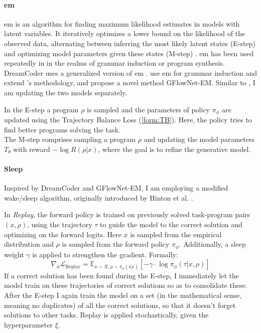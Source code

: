 \paragraph*{\acrfull{em}} \acrlong{em} is an algorithm for finding maximum likelihood estimates in models with latent variables. It iteratively optimizes a lower bound on the likelihood of the observed data, alternating between inferring the most likely latent states (E-step) and optimizing model parameters given these states (M-step) \cite{han2022data}. \acrshort{em} has been used repeatedly in in the realms of grammar induction or program synthesis. DreamCoder uses a generalized version of \acrshort{em} \cite{ellisDreamCoderBootstrappingInductive2021}. \citet{kimCompoundProbabilisticContextFree2019} use \acrshort{em} for grammar induction and \citet{Hu_Malkin_Jain_Everett_Graikos_Bengio_2023} extend \citeauthor{kimCompoundProbabilisticContextFree2019}'s \cite{kimCompoundProbabilisticContextFree2019} methodology, and propose a novel method GFlowNet-EM. Similar to \citet{Hu_Malkin_Jain_Everett_Graikos_Bengio_2023}, I am updating the two models separately.

In the E-step a program $\rho$ is sampled and the parameters of policy $\pi_\phi$ are updated using the Trajectory Balance Loss (\autoref{form:TB}). Here, the policy tries to find better programs solving the task. \\
The M-step comprises sampling a program $\rho$ and updating the model parameters $T_\theta$ with reward $-\log R(\rho|x)$, where the goal is to refine the generative model.

\paragraph*{Sleep} Inspired by DreamCoder and GFlowNet-EM, I am employing a modified wake/sleep algorithm, originally introduced by Hinton et al. \cite{hinton1995wake}. 

In \emph{Replay}, the forward policy is trained on previously solved task-program pairs $(x, \rho)$, using the trajectory $\tau$ to guide the model to the correct solution and optimizing on the forward logits. Here $x$ is sampled from the empirical distribution and $\rho$ is sampled from the forward policy $\pi_\phi$. Additionally, a sleep weight $\gamma$ is applied to strengthen the gradient. Formally:
\begin{equation}
    \nabla_\phi\mathcal{L}_{\text{Replay}} = \mathbb{E}_{x \sim X, \rho \sim \pi_\phi(\centerdot|x)} \left[ - \gamma \cdot \log \pi_\phi(\tau \vert x, \rho) \right]
\end{equation}
If a correct solution has been found during the E-step, I immediately let the model train on these trajectories of correct solutions so as to consolidate these.
After the E-step I again train the model on a set (in the mathematical sense, meaning no duplicates) of all the correct solutions, so that it doesn't forget solutions to other tasks.
Replay is applied stochastically, given the hyperparameter $\xi$.
    
